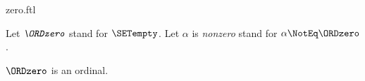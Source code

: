 \documentclass{stex}
\begin{document}
\begin{smodule}{zero.ftl}

\begin{convention}[forthel,for=ORDzero]
  Let $\emph{\ORDzero}$ stand for $\SETempty$.
  Let $\alpha$ is \emph{nonzero} stand for $\alpha \NotEq \ORDzero$.
\end{convention}

\begin{proposition}[forthel]
  $\ORDzero$ is an ordinal.
\end{proposition}
\end{smodule}
\end{document}
